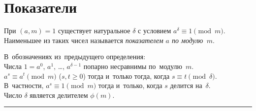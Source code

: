 
\section*{Показатели}


При $(a, m) = 1$ существует натуральное $\delta$ с условием
\(
    a^{\delta} \equiv 1 \pmod{m}
\).
Наименьшее из таких чисел называется \emph{показателем $a$ по модулю~$m$}.

\begin{problems}

\item
В~обозначениях из~предыдущего определения:
\\
\subproblem
Числа $1 = a^0$, $a^1$, \ldots, $a^{\delta-1}$ попарно несравнимы
по~модулю~$m$.
\\
\subproblem
$a^s \equiv a^t \pmod{m}$ ($s, t \geq 0$)
тогда и~только тогда, когда
$s \equiv t \pmod{\delta}$.
В~частности, $a^s \equiv 1 \pmod{m}$
тогда и~только, когда
$s$ делится на~$\delta$.
\\
\subproblem
Число $\delta$ является делителем $\phi(m)$.

\end{problems}

\medskip
\hrule

